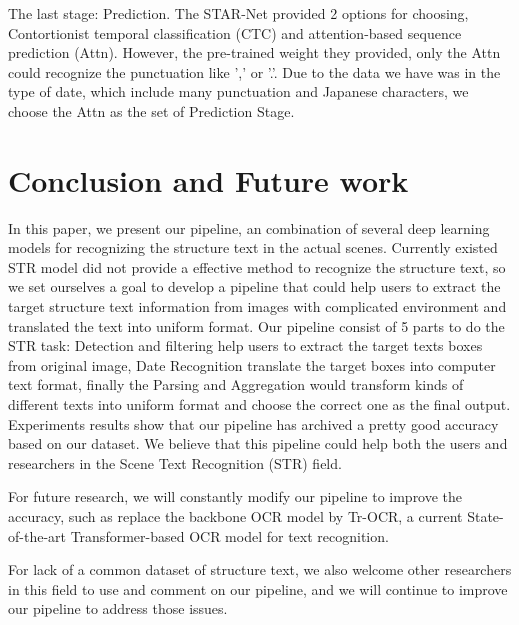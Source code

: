 \documentclass{article}
\begin{document}
The last stage: Prediction. The STAR-Net provided 2 options for choosing, Contortionist temporal classification (CTC) and attention-based sequence prediction (Attn). However, the pre-trained weight they provided, only the Attn could recognize the punctuation like ',' or '.'. Due to the data we have was in the type of date, which include many punctuation and Japanese characters, we choose the Attn as the set of Prediction Stage.

\section{Conclusion and Future work}

In this paper, we present our pipeline, an combination of several deep learning models for recognizing the structure text in the actual scenes. Currently existed STR model did not provide a effective method to recognize the structure text, so we set ourselves a goal to develop a pipeline that could help users to extract the target structure text information from images with complicated environment and translated the text into uniform format. Our pipeline consist of 5 parts to do the STR task: Detection and filtering help users to extract the target texts boxes from original image, Date Recognition translate the target boxes into computer text format, finally the Parsing and Aggregation would transform kinds of different texts into uniform format and choose the correct one as the final output. Experiments results show that our pipeline has archived a pretty good accuracy based on our dataset. We believe that this pipeline could help both the users and researchers in the Scene Text Recognition (STR) field.

For future research, we will constantly modify our pipeline to improve the accuracy, such as replace the backbone OCR model by Tr-OCR, a current State-of-the-art Transformer-based OCR model for text recognition.

For lack of a common dataset of structure text, we also welcome other researchers in this field to use and comment on our pipeline, and we will continue to improve our pipeline to address those issues.




\end{document}
